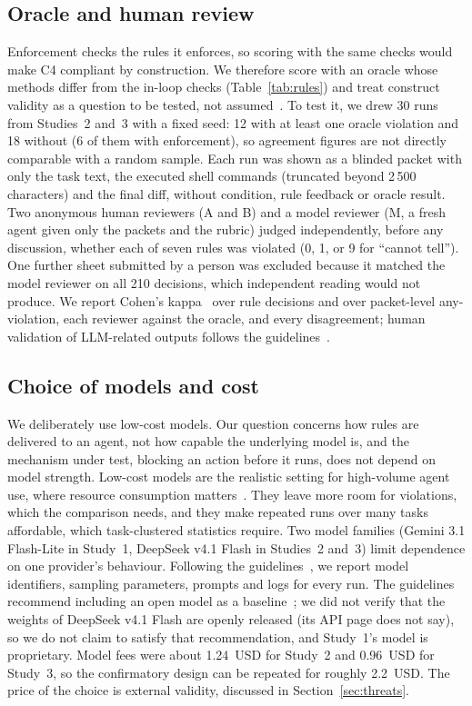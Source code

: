 \documentclass[conference]{IEEEtran}
\begin{document}
\subsection{Oracle and human review}
Enforcement checks the rules it enforces, so scoring with the same checks would make C4 compliant by construction.
We therefore score with an oracle whose methods differ from the in-loop checks (Table~\ref{tab:rules}) and treat construct validity as a question to be tested, not assumed~\cite{wohlin2012}.
To test it, we drew 30 runs from Studies~2 and~3 with a fixed seed: 12 with at least one oracle violation and 18 without (6 of them with enforcement), so agreement figures are not directly comparable with a random sample.
Each run was shown as a blinded packet with only the task text, the executed shell commands (truncated beyond 2\,500 characters) and the final diff, without condition, rule feedback or oracle result.
Two anonymous human reviewers (A and B) and a model reviewer (M, a fresh agent given only the packets and the rubric) judged independently, before any discussion, whether each of seven rules was violated (0, 1, or 9 for ``cannot tell'').
One further sheet submitted by a person was excluded because it matched the model reviewer on all 210 decisions, which independent reading would not produce.
We report Cohen's kappa~\cite{cohen1960} over rule decisions and over packet-level any-violation, each reviewer against the oracle, and every disagreement; human validation of LLM-related outputs follows the guidelines~\cite{baltes}.
\subsection{Choice of models and cost}
We deliberately use low-cost models. Our question concerns how rules are delivered to an agent, not how capable the underlying model is, and the mechanism under test, blocking an action before it runs, does not depend on model strength.
Low-cost models are the realistic setting for high-volume agent use, where resource consumption matters~\cite{sweeffi}.
They leave more room for violations, which the comparison needs, and they make repeated runs over many tasks affordable, which task-clustered statistics require.
Two model families (Gemini 3.1 Flash-Lite in Study~1, DeepSeek v4.1 Flash in Studies~2 and~3) limit dependence on one provider's behaviour.
Following the guidelines~\cite{baltes}, we report model identifiers, sampling parameters, prompts and logs for every run.
The guidelines recommend including an open model as a baseline~\cite{baltes}; we did not verify that the weights of DeepSeek v4.1 Flash are openly released (its API page does not say), so we do not claim to satisfy that recommendation, and Study~1's model is proprietary.
Model fees were about 1.24~USD for Study~2 and 0.96~USD for Study~3, so the confirmatory design can be repeated for roughly 2.2~USD.
The price of the choice is external validity, discussed in Section~\ref{sec:threats}.
\end{document}
